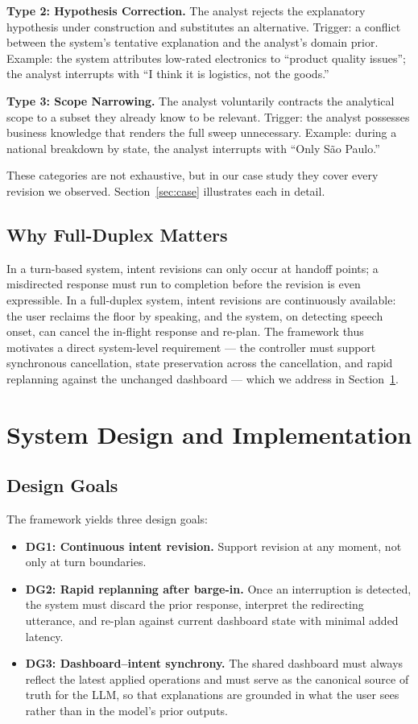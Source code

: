 \documentclass[journal]{IEEEtran}
\begin{document}
\textbf{Type 2: Hypothesis Correction.} The analyst rejects the explanatory hypothesis under construction and substitutes an alternative. Trigger: a conflict between the system's tentative explanation and the analyst's domain prior. Example: the system attributes low-rated electronics to ``product quality issues''; the analyst interrupts with ``I think it is logistics, not the goods.''

\textbf{Type 3: Scope Narrowing.} The analyst voluntarily contracts the analytical scope to a subset they already know to be relevant. Trigger: the analyst possesses business knowledge that renders the full sweep unnecessary. Example: during a national breakdown by state, the analyst interrupts with ``Only S\~ao Paulo.''

These categories are not exhaustive, but in our case study they cover every revision we observed. Section~\ref{sec:case} illustrates each in detail.

\subsection{Why Full-Duplex Matters}
In a turn-based system, intent revisions can only occur at handoff points; a misdirected response must run to completion before the revision is even expressible. In a full-duplex system, intent revisions are continuously available: the user reclaims the floor by speaking, and the system, on detecting speech onset, can cancel the in-flight response and re-plan. The framework thus motivates a direct system-level requirement --- the controller must support synchronous cancellation, state preservation across the cancellation, and rapid replanning against the unchanged dashboard --- which we address in Section~\ref{sec:system}.

\section{System Design and Implementation}
\label{sec:system}

\subsection{Design Goals}
The framework yields three design goals:
\begin{itemize}
\item \textbf{DG1: Continuous intent revision.} Support revision at any moment, not only at turn boundaries.
\item \textbf{DG2: Rapid replanning after barge-in.} Once an interruption is detected, the system must discard the prior response, interpret the redirecting utterance, and re-plan against current dashboard state with minimal added latency.
\item \textbf{DG3: Dashboard--intent synchrony.} The shared dashboard must always reflect the latest applied operations and must serve as the canonical source of truth for the LLM, so that explanations are grounded in what the user sees rather than in the model's prior outputs.
\end{itemize}
\end{document}
